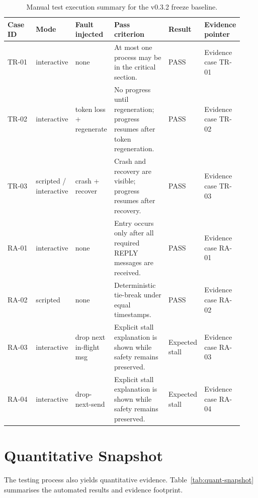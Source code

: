 \begin{table}[htbp]
\centering
\small
\renewcommand{\arraystretch}{1.15}
\begin{tabular}{p{0.12\linewidth} p{0.14\linewidth} p{0.16\linewidth} p{0.23\linewidth} p{0.12\linewidth} p{0.16\linewidth}}
\toprule
\textbf{Case ID} & \textbf{Mode} & \textbf{Fault injected} & \textbf{Pass criterion} & \textbf{Result} & \textbf{Evidence pointer} \\
\midrule
TR-01 & interactive & none & At most one process may be in the critical section. & PASS & Evidence case TR-01 \\
TR-02 & interactive & token loss + regenerate & No progress until regeneration; progress resumes after token regeneration. & PASS & Evidence case TR-02 \\
TR-03 & scripted / interactive & crash + recover & Crash and recovery are visible; progress resumes after recovery. & PASS & Evidence case TR-03 \\
RA-01 & interactive & none & Entry occurs only after all required REPLY messages are received. & PASS & Evidence case RA-01 \\
RA-02 & scripted & none & Deterministic tie-break under equal timestamps. & PASS & Evidence case RA-02 \\
RA-03 & interactive & drop next in-flight msg & Explicit stall explanation is shown while safety remains preserved. & Expected stall & Evidence case RA-03 \\
RA-04 & interactive & drop-next-send & Explicit stall explanation is shown while safety remains preserved. & Expected stall & Evidence case RA-04 \\
\bottomrule
\end{tabular}
\caption{Manual test execution summary for the v0.3.2 freeze baseline.}
\label{tab:test-summary}
\end{table}

\section{Quantitative Snapshot}
The testing process also yields quantitative evidence. Table~\ref{tab:quant-snapshot} summarises the automated results and evidence footprint.

